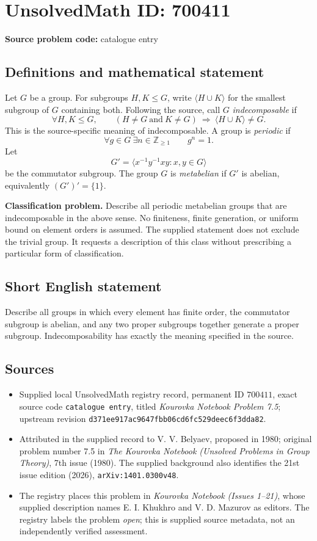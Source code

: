\documentclass[11pt]{article}
\newcommand{\Z}{\mathbb{Z}}
\begin{document}
\section*{UnsolvedMath ID: 700411}
\textbf{Source problem code:} catalogue entry
\subsection{Definitions and mathematical statement}
Let \(G\) be a group. For subgroups \(H,K\leq G\), write \(\langle H\cup K\rangle\) for the smallest subgroup of \(G\) containing both. Following the source, call \(G\) \emph{indecomposable} if
\[
\forall H,K\leq G,\qquad (H\neq G\ \text{and}\ K\neq G)\ \Longrightarrow\ \langle H\cup K\rangle\neq G.
\]
This is the source-specific meaning of indecomposable. A group is \emph{periodic} if
\[
\forall g\in G\ \exists n\in\Z_{\geq 1}\qquad g^n=1.
\]
Let
\[
G'=\langle x^{-1}y^{-1}xy:x,y\in G\rangle
\]
be the commutator subgroup. The group \(G\) is \emph{metabelian} if \(G'\) is abelian, equivalently \((G')'=\{1\}\).

\textbf{Classification problem.} Describe all periodic metabelian groups that are indecomposable in the above sense. No finiteness, finite generation, or uniform bound on element orders is assumed. The supplied statement does not exclude the trivial group. It requests a description of this class without prescribing a particular form of classification.
\subsection{Short English statement}
Describe all groups in which every element has finite order, the commutator subgroup is abelian, and any two proper subgroups together generate a proper subgroup. Indecomposability has exactly the meaning specified in the source.
\subsection{Sources}
\begin{itemize}
\item Supplied local UnsolvedMath registry record, permanent ID \(700411\), exact source code \texttt{catalogue entry}, titled \emph{Kourovka Notebook Problem 7.5}; upstream revision \texttt{d371ee917ac9647fbb06cd6fc529deec6f3dda82}.
\item Attributed in the supplied record to V. V. Belyaev, proposed in 1980; original problem number 7.5 in \emph{The Kourovka Notebook (Unsolved Problems in Group Theory)}, 7th issue (1980). The supplied background also identifies the 21st issue edition (2026), \texttt{arXiv:1401.0300v48}.
\item The registry places this problem in \emph{Kourovka Notebook (Issues 1--21)}, whose supplied description names E. I. Khukhro and V. D. Mazurov as editors. The registry labels the problem \emph{open}; this is supplied source metadata, not an independently verified assessment.
\end{itemize}
\end{document}
